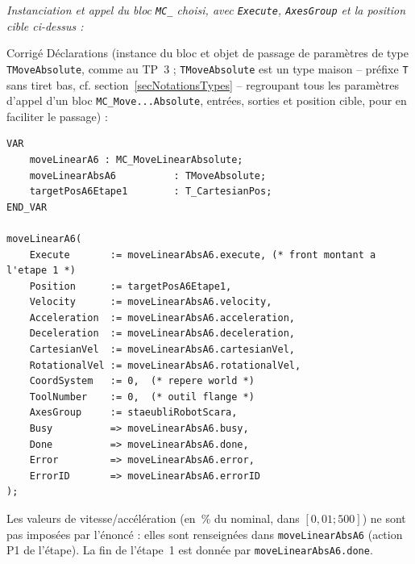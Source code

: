 \begin{UPSTIactivite}
\textit{Instanciation et appel du bloc \texttt{MC\_} choisi, avec
\texttt{Execute}, \texttt{AxesGroup} et la position cible ci-dessus :}

\begin{UPSTIcorrectionP}{Corrigé}
Déclarations (instance du bloc et objet de passage de paramètres de type
\texttt{TMoveAbsolute}, comme au TP~3 ; \texttt{TMoveAbsolute} est un type maison -- préfixe \texttt{T} sans tiret bas, cf. section~\ref{secNotationsTypes} -- regroupant tous les paramètres d'appel d'un bloc \texttt{MC\_Move...Absolute}, entrées, sorties et position cible, pour en faciliter le passage) :
\begin{lstlisting}
VAR
    moveLinearA6 : MC_MoveLinearAbsolute;
    moveLinearAbsA6          : TMoveAbsolute;
    targetPosA6Etape1        : T_CartesianPos;
END_VAR

moveLinearA6(
    Execute       := moveLinearAbsA6.execute, (* front montant a l'etape 1 *)
    Position      := targetPosA6Etape1,
    Velocity      := moveLinearAbsA6.velocity,
    Acceleration  := moveLinearAbsA6.acceleration,
    Deceleration  := moveLinearAbsA6.deceleration,
    CartesianVel  := moveLinearAbsA6.cartesianVel,
    RotationalVel := moveLinearAbsA6.rotationalVel,
    CoordSystem   := 0,  (* repere world *)
    ToolNumber    := 0,  (* outil flange *)
    AxesGroup     := staeubliRobotScara,
    Busy          => moveLinearAbsA6.busy,
    Done          => moveLinearAbsA6.done,
    Error         => moveLinearAbsA6.error,
    ErrorID       => moveLinearAbsA6.errorID
);
\end{lstlisting}
Les valeurs de vitesse/accélération (en~\% du nominal, dans
$[0{,}01;500]$) ne sont pas imposées par l'énoncé : elles sont renseignées
dans \texttt{moveLinearAbsA6} (action P1 de l'étape). La fin de l'étape~1
est donnée par \texttt{moveLinearAbsA6.done}.
\end{UPSTIcorrectionP}
\end{UPSTIactivite}

